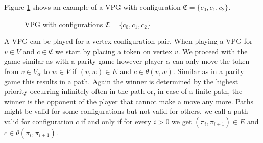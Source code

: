 \begin{example}
	Figure \ref{fig:vpg_basicex} shows an example of a VPG with configuration $\mathfrak{C} = \{c_0,c_1,c_2\}$.
	\begin{figure}[h]
		\centering
		\caption{VPG with configurations $\mathfrak{C} = \{c_0,c_1,c_2\}$}
		\label{fig:vpg_basicex}
	\end{figure}
\end{example}

A VPG can be played for a vertex-configuration pair. When playing a VPG for $v\in V$ and $c \in \mathfrak{C}$ we start by placing a token on vertex $v$. We proceed with the game similar as with a parity game however player $\alpha$ can only move the token from $v \in V_\alpha$ to $w \in V$ if $(v,w) \in E$ and $c \in \theta(v,w)$. Similar as in a parity game this results in a path. Again the winner is determined by the highest priority occurring infinitely often in the path or, in case of a finite path, the winner is the opponent of the player that cannot make a move any more. Paths might be valid for some configurations but not valid for others, we call a path valid for configuration $c$ if and only if for every $i > 0$ we get $(\pi_{i},\pi_{i+1}) \in E$ and $c \in \theta(\pi_{i},\pi_{i+1})$.


